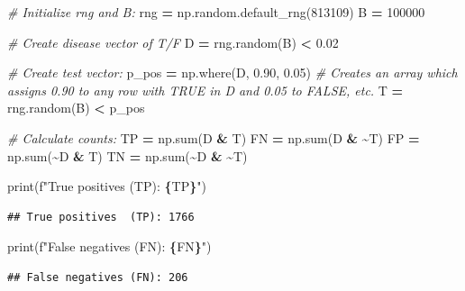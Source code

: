 \documentclass[
]{article}
\newenvironment{Shaded}{\begin{snugshade}}{\end{snugshade}}
\newcommand{\BuiltInTok}[1]{#1}
\newcommand{\CommentTok}[1]{\textcolor[rgb]{0.56,0.35,0.01}{\textit{#1}}}
\newcommand{\DecValTok}[1]{\textcolor[rgb]{0.00,0.00,0.81}{#1}}
\newcommand{\FloatTok}[1]{\textcolor[rgb]{0.00,0.00,0.81}{#1}}
\newcommand{\NormalTok}[1]{#1}
\newcommand{\OperatorTok}[1]{\textcolor[rgb]{0.81,0.36,0.00}{\textbf{#1}}}
\newcommand{\SpecialCharTok}[1]{\textcolor[rgb]{0.81,0.36,0.00}{\textbf{#1}}}
\newcommand{\SpecialStringTok}[1]{\textcolor[rgb]{0.31,0.60,0.02}{#1}}
\begin{document}
\begin{Shaded}
\begin{Highlighting}[]
\CommentTok{\# Initialize rng and B:}
\NormalTok{rng }\OperatorTok{=}\NormalTok{ np.random.default\_rng(}\DecValTok{813109}\NormalTok{)}
\NormalTok{B }\OperatorTok{=} \DecValTok{100000}

\CommentTok{\# Create disease vector of T/F }
\NormalTok{D }\OperatorTok{=}\NormalTok{ rng.random(B) }\OperatorTok{\textless{}} \FloatTok{0.02}

\CommentTok{\# Create test vector:}
\NormalTok{p\_pos }\OperatorTok{=}\NormalTok{ np.where(D, }\FloatTok{0.90}\NormalTok{, }\FloatTok{0.05}\NormalTok{) }\CommentTok{\# Creates an array which assigns 0.90 to any row with TRUE in D and 0.05 to FALSE, etc.}
\NormalTok{T }\OperatorTok{=}\NormalTok{ rng.random(B) }\OperatorTok{\textless{}}\NormalTok{ p\_pos}

\CommentTok{\# Calculate counts:}
\NormalTok{TP }\OperatorTok{=}\NormalTok{ np.}\BuiltInTok{sum}\NormalTok{(D }\OperatorTok{\&}\NormalTok{ T)}
\NormalTok{FN }\OperatorTok{=}\NormalTok{ np.}\BuiltInTok{sum}\NormalTok{(D }\OperatorTok{\&} \OperatorTok{\textasciitilde{}}\NormalTok{T)}
\NormalTok{FP }\OperatorTok{=}\NormalTok{ np.}\BuiltInTok{sum}\NormalTok{(}\OperatorTok{\textasciitilde{}}\NormalTok{D }\OperatorTok{\&}\NormalTok{ T)}
\NormalTok{TN }\OperatorTok{=}\NormalTok{ np.}\BuiltInTok{sum}\NormalTok{(}\OperatorTok{\textasciitilde{}}\NormalTok{D }\OperatorTok{\&} \OperatorTok{\textasciitilde{}}\NormalTok{T)}

\BuiltInTok{print}\NormalTok{(}\SpecialStringTok{f"True positives  (TP): }\SpecialCharTok{\{}\NormalTok{TP}\SpecialCharTok{\}}\SpecialStringTok{"}\NormalTok{)}
\end{Highlighting}
\end{Shaded}

\begin{verbatim}
## True positives  (TP): 1766
\end{verbatim}

\begin{Shaded}
\begin{Highlighting}[]
\BuiltInTok{print}\NormalTok{(}\SpecialStringTok{f"False negatives (FN): }\SpecialCharTok{\{}\NormalTok{FN}\SpecialCharTok{\}}\SpecialStringTok{"}\NormalTok{)}
\end{Highlighting}
\end{Shaded}

\begin{verbatim}
## False negatives (FN): 206
\end{verbatim}
\end{document}
